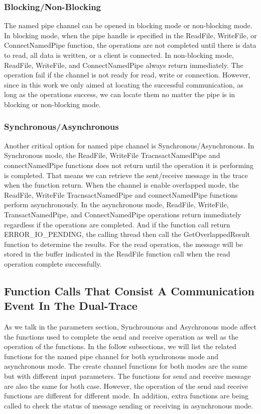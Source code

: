 \subsubsection{Blocking/Non-Blocking}
The named pipe channel can be opened in blocking mode or non-blocking mode. In blocking mode, when the pipe handle is specified in the ReadFile, WriteFile, or ConnectNamedPipe function, the operations are not completed until there is data to read, all data is written, or a client is connected. In non-blocking mode, ReadFile, WriteFile, and ConnectNamedPipe always return immediately. The operation fail if the channel is not ready for read, write or connection. However, since in this work we only aimed at locating the successful communication, as long as the operations success, we can locate them no matter the pipe is in blocking or non-blocking mode.

\subsubsection{Synchronous/Asynchronous}
Another critical option for named pipe channel is Synchronous/Asynchronous. In Synchronous mode, the ReadFile, WriteFile TracnsactNamedPipe and connectNamedPipe functions does not return until the operation it is performing is completed. That means we can retrieve the sent/receive message in the trace when the function return. When the channel is enable overlapped mode, the ReadFile, WriteFile TracnsactNamedPipe and connectNamedPipe functions perform asynchronously. In the asynchronous mode, ReadFile, WriteFile, TransactNamedPipe, and ConnectNamedPipe operations return immediately regardless if the operations are completed. And if the function call return ERROR\_IO\_PENDING, the calling thread then call the GetOverlappedResult function to determine the results. For the read operation, the message will be stored in the buffer indicated in the ReadFile function call when the read operation complete successfully.




\subsection{Function Calls That Consist A Communication Event In The Dual-Trace}
As we talk in the parameters section, Synchrounous and Asychronous mode affect the functions used to complete the send and receive operation as well as the operation of the functions. In the follow subsections, we will list the related functions for the named pipe channel for both synchronous mode and asynchronous mode. The create channel functions for both modes are the same but with different input parameters. The functions for send and receive message are also the same for both case. However, the operation of the send and receive functions are different for different mode. In addition, extra functions are being called to check the status of message sending or receiving in asynchronous mode.
